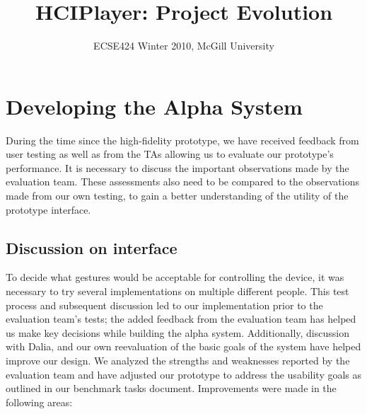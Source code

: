 \documentclass[10pt,letterpaper]{article}
\begin{document}
\title{HCIPlayer: Project Evolution}
\author{ECSE424 Winter 2010, McGill University}
\renewcommand{\today}{Updated: Tuesday, April 13th, 2010}
\maketitle


\section*{Developing the Alpha System}
During the time since the high-fidelity prototype, we have received feedback from user testing as well as from the TAs allowing us to evaluate our prototype's performance. It is necessary to discuss the important observations made by the evaluation team. These assessments also need to be compared to the observations made from our own testing, to gain a better understanding of the utility of the prototype interface.

\subsection*{Discussion on interface}
To decide what gestures would be acceptable for controlling the device, it was necessary to try several implementations on multiple different people. This test process and subsequent discussion led to our implementation prior to the evaluation team's tests; the added feedback from the evaluation team has helped us make key decisions while building the alpha system. Additionally, discussion with Dalia, and our own reevaluation of the basic goals of the system have helped improve our design. We analyzed the strengths and weaknesses reported by the evaluation team and have adjusted our prototype to address the usability goals as outlined in our benchmark tasks document. Improvements were made in the following areas:
\end{document}
